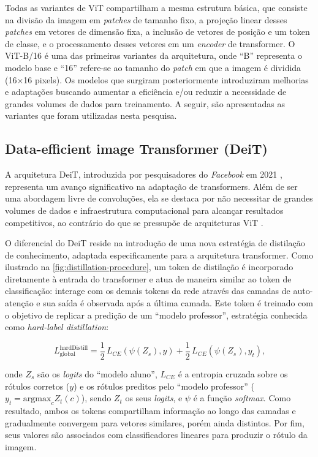Todas as variantes de ViT compartilham a mesma estrutura básica, que consiste na divisão da imagem em \textit{patches} de tamanho fixo, a projeção linear desses \textit{patches} em vetores de dimensão fixa, a inclusão de vetores de posição e um token de classe, e o processamento desses vetores em um \textit{encoder} de transformer. O ViT-B/16 \cite{Dosovitskiy2021} é uma das primeiras variantes da arquitetura, onde ``B'' representa o modelo base e ``16'' refere-se ao tamanho do \textit{patch} em que a imagem é dividida (16×16 pixels). Os modelos que surgiram posteriormente introduziram melhorias e adaptações buscando aumentar a eficiência e/ou reduzir a necessidade de grandes volumes de dados para treinamento. A seguir, são apresentadas as variantes que foram utilizadas nesta pesquisa.

\subsection{Data-efficient image Transformer (DeiT)}

A arquitetura DeiT, introduzida por pesquisadores do \textit{Facebook} em 2021 \cite{Touvron2021}, representa um avanço significativo na adaptação de transformers. Além de ser uma abordagem livre de convoluções, ela se destaca por não necessitar de grandes volumes de dados e infraestrutura computacional para alcançar resultados competitivos, ao contrário do que se pressupõe de arquiteturas ViT \cite{Dosovitskiy2021}.

O diferencial do DeiT reside na introdução de uma nova estratégia de distilação de conhecimento, adaptada especificamente para a arquitetura transformer. Como ilustrado na \autoref{fig:distillation-procedure}, um token de distilação é incorporado diretamente à entrada do transformer e atua de maneira similar ao token de classificação: interage com os demais tokens da rede através das camadas de auto-atenção e sua saída é observada após a última camada. Este token é treinado com o objetivo de replicar a predição de um ``modelo professor'', estratégia conhecida como \textit{hard-label distillation}:

\begin{equation}
    L_{\text{global}}^{\text{hardDistill}} = \frac{1}{2} \, L_{CE}\left( \psi(Z_s), y \right) + \frac{1}{2} \, L_{CE}\left( \psi(Z_s), y_t \right) \text{,}
\end{equation}

onde $Z_s$ são os \textit{logits} do ``modelo aluno'', $L_{CE}$ é a entropia cruzada sobre os rótulos corretos ($y$) e os rótulos preditos pelo ``modelo professor'' ($y_t = \text{argmax}_c Z_t(c)$), sendo $Z_t$ os seus \textit{logits}, e $\psi$ é a função \textit{softmax}. Como resultado, ambos os tokens compartilham informação ao longo das camadas e gradualmente convergem para vetores similares, porém ainda distintos. Por fim, seus valores são associados com classificadores lineares para produzir o rótulo da imagem.

